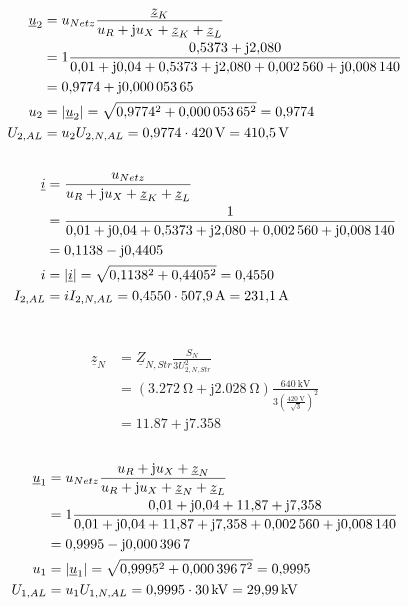 \documentclass[11pt,a4paper]{scrartcl}
\DeclarePairedDelimiter{\abs}{\lvert}{\rvert}
\newcommand{\mybr}[1]{\left(#1\right)}
\renewcommand{\j}{\mathrm{j}}
\newcommand{\Z}{\underline{Z}}
\newcommand{\z}{\underline{z}}
\renewcommand{\u}{\underline{u}}
\renewcommand{\i}{\underline{i}}
\newcommand{\0}{_{\mybr{0}}}
\newcommand{\1}{_{\mybr{1}}}
\newcommand{\2}{_{\mybr{2}}}
\newcommand{\UPA}{U_{1,AL}}
\newcommand{\USA}{U_{2,AL}}
\newcommand{\ISA}{I_{2,AL}}
\newcommand{\USNS}{U_{2,N,Str}}
\newcommand{\UPNA}{U_{1,N,AL}}
\newcommand{\USNA}{U_{2,N,AL}}
\newcommand{\ISNA}{I_{2,N,AL}}
\begin{document}
\subsection{}
\begin{align}
\u_2&=u_{Netz}\frac{\z_K}{u_R+\j u_X+\z_K+\z_L}\\
&=1\frac{\num{0.5373}+\j\num{2.080}}{\num{0.01}+\j\num{0.04}+\num{0.5373}+\j\num{2.080}+\num{0.002560}+\j\num{0.008140}}\\
&=\num{0.9774}+\j\num{0.00005365}\\
u_2&=\abs{\u_2}=\sqrt{\num{0.9774}^2+\num{0.00005365}^2}=\num{0.9774}\\
\USA&=u_2\USNA=\num{0.9774}\cdot\SI{420}{\volt}=\SI{410.5}{\volt}
\end{align}

\subsection{}
\begin{align}
\i&=\frac{u_{Netz}}{u_R+\j u_X+\z_K+\z_L}\\
&=\frac{1}{\num{0.01}+\j\num{0.04}+\num{0.5373}+\j\num{2.080}+\num{0.002560}+\j\num{0.008140}}\\
&=\num{0.1138}-\j\num{0.4405}\\
i&=\abs{\i}=\sqrt{\num{0.1138}^2+\num{0.4405}^2}=\num{0.4550}\\
\ISA&=i\ISNA=\num{0.4550}\cdot\SI{507.9}{\ampere}=\SI{231.1}{\ampere}
\end{align}

\section{}
\begin{align}
\z_N&=\Z_{N,Str}\frac{S_N}{3\USNS^2}\\
&=\mybr{\SI{3.272}{\ohm}+\j\SI{2.028}{\ohm}}\frac{\SI{640}{\kilo\volt}}{3\mybr{\frac{\SI{420}{\volt}}{\sqrt{3}}}^2}\\
&=\num{11.87}+\j\num{7.358}
\end{align}

\subsection{}
\begin{align}
\u_1&=u_{Netz}\frac{u_R+\j u_X+\z_N}{u_R+\j u_X+\z_N+\z_L}\\
&=1\frac{\num{0.01}+\j\num{0.04}+\num{11.87}+\j\num{7.358}}{\num{0.01}+\j\num{0.04}+\num{11.87}+\j\num{7.358}+\num{0.002560}+\j\num{0.008140}}\\
&=\num{0.9995}-\j\num{0.0003967}\\
u_1&=\abs{\u_1}=\sqrt{\num{0.9995}^2+\num{0.0003967}^2}=\num{0.9995}\\
\UPA&=u_1\UPNA=\num{0.9995}\cdot\SI{30}{\kilo\volt}=\SI{29.99}{\kilo\volt}
\end{align}
\end{document}
